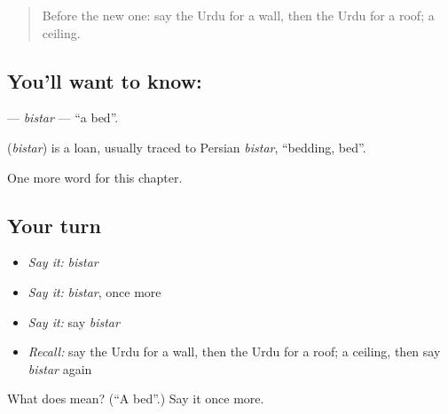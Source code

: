 \label{lesson:UR-C58-bistar}



\begin{quote}
Before the new one: say the Urdu for a wall, then the Urdu for a roof; a ceiling.
\end{quote}

\subsection*{You'll want to know: }
\textbf{} — \emph{bistar} — \textquotedblleft{}a bed\textquotedblright{}.

\begin{cousinweb}
\textbf{} (\emph{bistar}) is a loan, usually traced to Persian \emph{bistar}, \textquotedblleft{}bedding, bed\textquotedblright{}.
\end{cousinweb}

\begin{grammarlens}[title={What you've built}]
One more word for this chapter.
\end{grammarlens}

\subsection*{Your turn}
\begin{itemize}
\raggedright
  \item \emph{Say it:} \emph{bistar}
  \item \emph{Say it:} \emph{bistar}, once more
  \item \emph{Say it:} say \emph{bistar}
  \item \emph{Recall:} say the Urdu for a wall, then the Urdu for a roof; a ceiling, then say \emph{bistar} again
\end{itemize}

\begin{tcolorbox}[breakable,colback=teal!4,colframe=teal!35!black,title={Before you move on}]
What does  mean? (\textquotedblleft{}A bed\textquotedblright{}.) Say it once more.
\end{tcolorbox}
